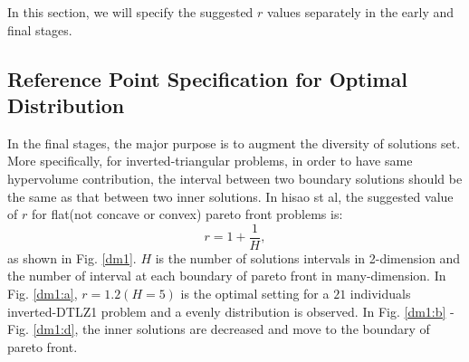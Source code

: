 \documentclass[conference]{IEEEtran}
\begin{document}
In this section, we will specify the suggested $r$ values separately
in the early and final stages.

%
\subsection{Reference Point Specification for Optimal Distribution}
In the final stages, the major purpose is to augment the diversity of solutions set.
More specifically, for inverted-triangular problems, in order to have same hypervolume contribution, 
the interval between two boundary solutions should be the same as that between two inner solutions.
In hisao st al\cite{hisao:RPhowtoSpecify}, the suggested value of $r$ for flat(not concave or convex) pareto front problems is:
\begin{equation}\label{eod}
  r=1+\frac{1}{H},
\end{equation}
as shown in Fig. \ref{dm1}. $H$ is the number of solutions intervals in 2-dimension 
and the number of interval at each boundary of pareto front in many-dimension.
In Fig. \ref{dm1:a}, $r=1.2(H=5)$ is the optimal setting for a $21$ individuals 
inverted-DTLZ1 problem and a evenly distribution is observed. 
In Fig. \ref{dm1:b} - Fig. \ref{dm1:d}, the inner solutions are decreased and move to
the boundary of pareto front. 
\end{document}
